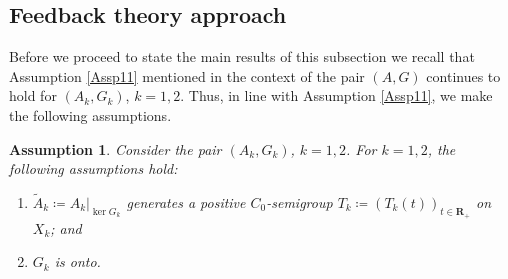 \documentclass[a4paper,11pt,reqno]{amsart}
\def\R{\mathbf{R}}
\theoremstyle{plain}
\numberwithin{equation}{section}
\newtheorem{mainassumptions}{Assumption}[section]
\begin{document}
\subsection{Feedback theory approach}

Before we proceed to state the main results of this subsection we recall that Assumption \ref{Assp11} mentioned in the context of the pair $(A,G)$ continues to hold for $(A_k,G_k)$, $k=1,2$. Thus, in line with Assumption \ref{Assp11}, we make the following assumptions.
\begin{mainassumptions}\label{Assp12}
Consider the pair $(A_k,G_k)$, $k=1,2$. For $k=1,2$, the following assumptions hold:
\begin{enumerate}[label=\normalfont(\roman*)]
\item $\tilde{{A}}_k\coloneqq {A}_k\vert_{\ker {G}_k}$ generates a positive $C_0$-semigroup ${{T}}_k\coloneqq ({T}_k(t))_{t\in\R_+}$ on ${X}_k$; and
\item ${G}_k$ is onto.
\end{enumerate}
\end{mainassumptions}
\end{document}
